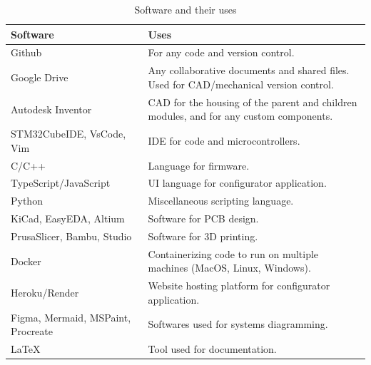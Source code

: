 \documentclass[a4]{article}
\begin{document}
\begin{table}[h!]
\centering
\renewcommand{\arraystretch}{1.2} %
\begin{tabularx}{\linewidth}{|X|X|}
\hline
\textcolor{McMasterMaroon}{\textbf{Software}} & \textcolor{McMasterMaroon}{\textbf{Uses}} \\
\hline
Github & For any code and version control. \\
\hline
Google Drive & Any collaborative documents and shared files. Used for CAD/mechanical version control. \\
\hline
Autodesk Inventor & CAD for the housing of the parent and children modules, and for any custom components. \\
\hline
STM32CubeIDE, VsCode, Vim & IDE for code and microcontrollers. \\
\hline
C/C++ & Language for firmware. \\
\hline
TypeScript/JavaScript & UI language for configurator application. \\
\hline
Python & Miscellaneous scripting language. \\
\hline
KiCad, EasyEDA, Altium & Software for PCB design. \\
\hline
PrusaSlicer, Bambu, Studio & Software for 3D printing. \\
\hline
Docker & Containerizing code to run on multiple machines (MacOS, Linux, Windows). \\
\hline
Heroku/Render & Website hosting platform for configurator application. \\
\hline
Figma, Mermaid, MSPaint, Procreate & Softwares used for systems diagramming. \\
\hline
LaTeX & Tool used for documentation. \\
\hline
\end{tabularx}
\caption{Software and their uses}
\end{table}
\end{document}
